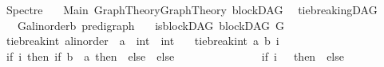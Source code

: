 %
\begin{isabellebody}%
%
%
\isadelimtheory
\isanewline
\isanewline
%
\endisadelimtheory
%
\isatagtheory
{}\isamarkupfalse%
\ Spectre\isanewline
\ \ \ Main\ Graph{\isacharunderscore}{\kern0pt}Theory{\isachardot}{\kern0pt}Graph{\isacharunderscore}{\kern0pt}Theory\ blockDAG\ \isanewline
{}%
\endisatagtheory
{\isafoldtheory}%
%
\isadelimtheory
%
\endisadelimtheory
%
\isadelimdocument
%
\endisadelimdocument
%
\isatagdocument
%
\isamarkuptrue%
%
\endisatagdocument
{\isafolddocument}%
%
\isadelimdocument
%
\endisadelimdocument
{}\isamarkupfalse%
\ tie{\isacharunderscore}{\kern0pt}breakingDAG\ {\isacharequal}{\kern0pt}\ \isanewline
\ \ \ G{\isacharcolon}{\kern0pt}{\isacharcolon}{\kern0pt}{\isachardoublequoteopen}{\isacharparenleft}{\kern0pt}{\isacharprime}{\kern0pt}a{\isacharcolon}{\kern0pt}{\isacharcolon}{\kern0pt}linorder{\isacharcomma}{\kern0pt}{\isacharprime}{\kern0pt}b{\isacharparenright}{\kern0pt}\ pre{\isacharunderscore}{\kern0pt}digraph{\isachardoublequoteclose}\isanewline
\ \ \ is{\isacharunderscore}{\kern0pt}blockDAG{\isacharcolon}{\kern0pt}\ {\isachardoublequoteopen}blockDAG\ G{\isachardoublequoteclose}%
\isadelimdocument
%
\endisadelimdocument
%
\isatagdocument
%
\isamarkuptrue%
%
\endisatagdocument
{\isafolddocument}%
%
\isadelimdocument
%
\endisadelimdocument
{}\isamarkupfalse%
\ tie{\isacharunderscore}{\kern0pt}break{\isacharunderscore}{\kern0pt}int{\isacharcolon}{\kern0pt}{\isacharcolon}{\kern0pt}\ {\isachardoublequoteopen}{\isacharprime}{\kern0pt}a{\isacharcolon}{\kern0pt}{\isacharcolon}{\kern0pt}linorder\ {\isasymRightarrow}\ {\isacharprime}{\kern0pt}a\ {\isasymRightarrow}\ int\ {\isasymRightarrow}\ int{\isachardoublequoteclose}\isanewline
\ \ \ {\isachardoublequoteopen}tie{\isacharunderscore}{\kern0pt}break{\isacharunderscore}{\kern0pt}int\ a\ b\ i\ {\isacharequal}{\kern0pt}\isanewline
\ {\isacharparenleft}{\kern0pt}if\ i{\isacharequal}{\kern0pt}{}\ then\ {\isacharparenleft}{\kern0pt}if\ {\isacharparenleft}{\kern0pt}b\ {\isacharless}{\kern0pt}\ a{\isacharparenright}{\kern0pt}\ then\ {\isacharminus}{\kern0pt}{}\ else\ {}{\isacharparenright}{\kern0pt}\ else\ \isanewline
\ \ \ \ \ \ \ \ \ \ \ \ \ \ {\isacharparenleft}{\kern0pt}if\ i\ {\isachargreater}{\kern0pt}\ {}\ then\ {}\ else\ {\isacharminus}{\kern0pt}{}{\isacharparenright}{\kern0pt}{\isacharparenright}{\kern0pt}{\isachardoublequoteclose}\isanewline

\end{isabellebody}
